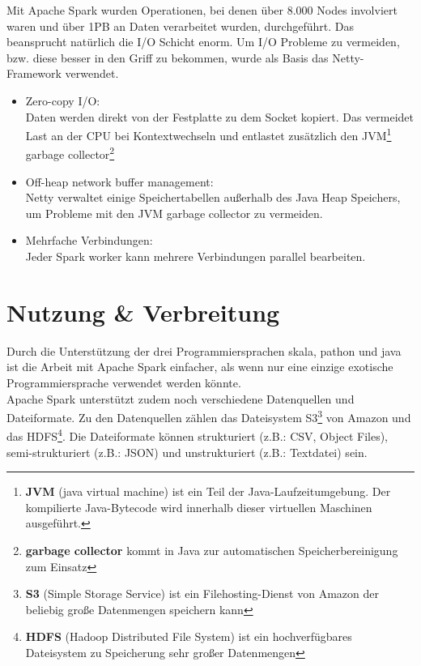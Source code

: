 Mit Apache Spark wurden Operationen, bei denen über 8.000 Nodes involviert waren und über 1PB an Daten verarbeitet wurden, durchgeführt. Das beansprucht natürlich die I/O Schicht enorm.
Um I/O Probleme zu vermeiden, bzw. diese besser in den Griff zu bekommen, wurde als Basis das Netty-Framework verwendet.
\begin{itemize}
	\item Zero-copy I/O:\\
	Daten werden direkt von der Festplatte zu dem Socket kopiert. Das vermeidet Last an der CPU bei Kontextwechseln und entlastet zusätzlich den JVM\footnote{\textbf{JVM} (java virtual machine) ist ein Teil der Java-Laufzeitumgebung. Der kompilierte Java-Bytecode wird innerhalb dieser virtuellen Maschinen ausgeführt.} garbage collector\footnote{\textbf{garbage collector} kommt in Java zur automatischen Speicherbereinigung zum Einsatz}
	\item Off-heap network buffer management:\\
	Netty verwaltet einige Speichertabellen außerhalb des Java Heap Speichers, um Probleme mit den JVM garbage collector zu vermeiden.
	\item Mehrfache Verbindungen:\\
	Jeder Spark worker kann mehrere Verbindungen parallel bearbeiten.
\end{itemize}


\newpage
\section{Nutzung \& Verbreitung}
Durch die Unterstützung der drei Programmiersprachen skala, pathon und java ist die Arbeit mit Apache Spark einfacher, als wenn nur eine einzige exotische Programmiersprache verwendet werden könnte. \\



\noindent
Apache Spark unterstützt zudem noch verschiedene Datenquellen und Dateiformate.  Zu den Datenquellen zählen das Dateisystem S3\footnote{\textbf{S3} (Simple Storage Service) ist ein Filehosting-Dienst von Amazon der beliebig große Datenmengen speichern kann} von Amazon und das HDFS\footnote{\textbf{HDFS} (Hadoop Distributed File System) ist ein hochverfügbares Dateisystem zu Speicherung sehr großer Datenmengen}.
Die Dateiformate können strukturiert (z.B.: CSV, Object Files), semi-strukturiert (z.B.: JSON) und unstrukturiert (z.B.: Textdatei) sein.\\

